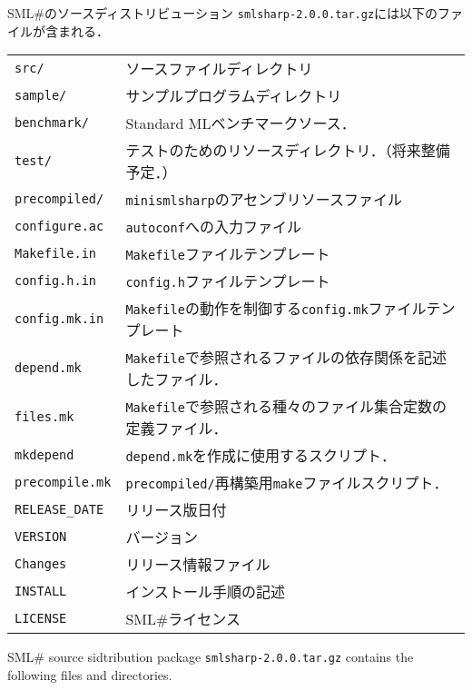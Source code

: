 \documentclass{jbook}
\newcommand{\smlsharp}{SML\#}
\newcommand{\code}[1]{\mbox{\large\tt #1}}
\begin{document}
\ifjp%
	\smlsharp{}のソースディストリビューション
\code{smlsharp-2.0.0.tar.gz}には以下のファイルが含まれる．

\begin{tabular}{ll}
\code{src/} &  ソースファイルディレクトリ\\
\code{sample/}& サンプルプログラムディレクトリ\\
\code{benchmark/}& Standard MLベンチマークソース．\\
\code{test/}& テストのためのリソースディレクトリ．（将来整備予定．）\\
\code{precompiled/}& \code{minismlsharp}のアセンブリソースファイル\\
\code{configure.ac}& \code{autoconf}への入力ファイル\\
\code{Makefile.in}& \code{Makefile}ファイルテンプレート\\
\code{config.h.in}& \code{config.h}ファイルテンプレート\\
\code{config.mk.in}& \code{Makefile}の動作を制御する\code{config.mk}ファイルテンプレート\\
\code{depend.mk}& \code{Makefile}で参照されるファイルの依存関係を記述したファイル．\\
\code{files.mk}& \code{Makefile}で参照される種々のファイル集合定数の定義ファイル．\\
\code{mkdepend}& \code{depend.mk}を作成に使用するスクリプト．\\
\code{precompile.mk}& \code{precompiled/}再構築用\code{make}ファイルスクリプト．\\
\code{RELEASE\_DATE} & リリース版日付\\
\code{VERSION} & バージョン\\
\code{Changes} & リリース情報ファイル\\
\code{INSTALL} & インストール手順の記述\\
\code{LICENSE} & \smlsharp{}ライセンス
\end{tabular}
\else%
	\smlsharp{} source sidtribution package 
\code{smlsharp-2.0.0.tar.gz} contains the following files and
directories.
\end{document}
